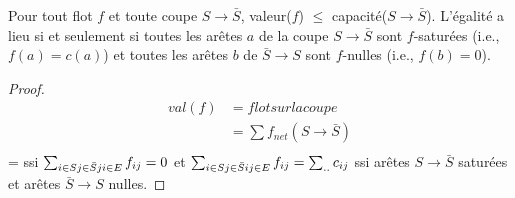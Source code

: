 \begin{mylem}
  Pour tout flot $f$ et toute coupe $S \to \bar{S}$, valeur($f$) $\leq$ capacité($S \to \bar{S}$). L’égalité a lieu si et seulement si toutes les arêtes $a$ de la coupe $S \to \bar{S}$ sont $f$-saturées (i.e., $f(a) = c(a)$) et toutes les arêtes $b$ de $\bar{S} \to S$ sont $f$-nulles (i.e., $f(b) = 0$).

  \begin{proof}
    \begin{align*}
      val(f) & = flot sur la coupe\\
             & = \sum f_{net}(S \to \bar{S})\\
    \end{align*}
    = ssi $\sum_{i \in S\\j \in \bar{S}\\ji \in E} f_{ij} = 0$ et $\sum_{i \in S\\j \in \bar{S}\\ij \in E} f_{ij} = \sum_{..} c_{ij}$
    ssi arêtes $S \to \bar{S}$ saturées et arêtes $\bar{S} \to S$ nulles.
  \end{proof}
\end{mylem}

